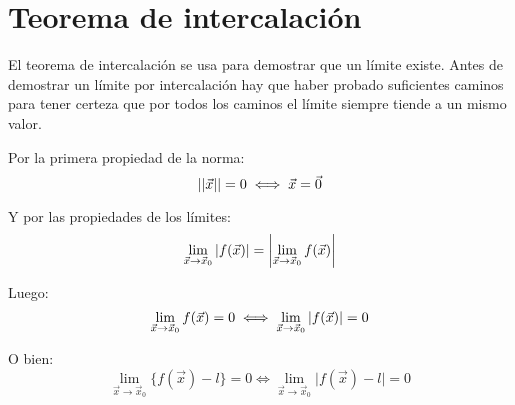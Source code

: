 \documentclass[a5paper,12pt,twoside]{book}
\begin{document}





\section{Teorema de intercalación}

El teorema de intercalación se usa para demostrar que un límite existe.
Antes de demostrar un límite por intercalación hay que haber probado suficientes caminos para tener certeza que por todos los caminos el límite siempre tiende a un mismo valor.

Por la primera propiedad de la norma:
\begin{equation*}
    {\left|\left| {\Vec{x}} \right|\right|} = 0 \iff \Vec{x} = \Vec{0}
\end{equation*}

Y por las propiedades de los límites:
\begin{equation*}
    \displaystyle\lim_{\Vec{x} \to \Vec{x}_0} {\left| {f(\Vec{x})} \right|}
    = {\left| {\displaystyle\lim_{\Vec{x} \to \Vec{x}_0} f(\Vec{x})} \right|}
\end{equation*}

Luego:
\begin{equation*}
    \lim_{\Vec{x} \to \Vec{x}_0} f(\Vec{x}) = 0 \iff \lim_{\Vec{x} \to \Vec{x}_0} {\left| {f(\Vec{x})} \right|} = 0
\end{equation*}

O bien:
\begin{equation*}
    \lim_{\Vec{x} \to \Vec{x}_0} \Big\{ f(\Vec{x}) - l \Big\} = 0
    \iff
    \lim_{\Vec{x} \to \Vec{x}_0} \Big| f(\Vec{x}) - l \Big| = 0
\end{equation*}
\end{document}
